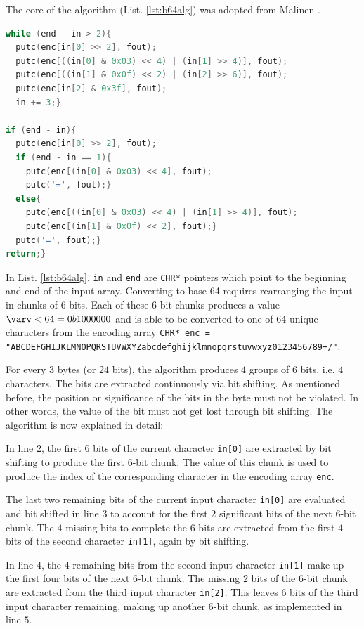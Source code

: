 \bigbreak
The core of the algorithm (List. \ref{lst:b64alg}) was adopted from Malinen \cite{Mal05}.

\begin{lstlisting}[language=C, caption=b64 algorithm, label=lst:b64alg]
while (end - in > 2){
  putc(enc[in[0] >> 2], fout);
  putc(enc[((in[0] & 0x03) << 4) | (in[1] >> 4)], fout);
  putc(enc[((in[1] & 0x0f) << 2) | (in[2] >> 6)], fout);
  putc(enc[in[2] & 0x3f], fout);
  in += 3;}
  
if (end - in){
  putc(enc[in[0] >> 2], fout);
  if (end - in == 1){
    putc(enc[(in[0] & 0x03) << 4], fout);
    putc('=', fout);}
  else{
    putc(enc[((in[0] & 0x03) << 4) | (in[1] >> 4)], fout);
    putc(enc[(in[1] & 0x0f) << 2], fout);}
  putc('=', fout);}
return;}
\end{lstlisting}

In List. \ref{lst:b64alg}, \lstinline{in} and \lstinline{end} are \lstinline{CHR*} pointers which point to the beginning and end of the input array. Converting to base 64 requires rearranging the input in chunks of 6 bits. Each of these 6-bit chunks produces a value $\varv < 64 = 0b1000000$ and is able to be converted to one of 64 unique characters from the encoding array \lstinline{CHR* enc = "ABCDEFGHIJKLMNOPQRSTUVWXYZabcdefghijklmnopqrstuvwxyz0123456789+/"}. 

\bigbreak
For every $3$ bytes (or $24$ bits), the algorithm produces $4$ groups of $6$ bits, i.e. $4$ characters. The bits are extracted continuously via bit shifting. As mentioned before, the position or significance of the bits in the byte must not be violated. In other words, the value of the bit must not get lost through bit shifting. The algorithm is now explained in detail: 

\bigbreak
In line $2$, the first $6$ bits of the current character \lstinline{in[0]} are extracted by bit shifting to produce the first $6$-bit chunk. The value of this chunk is used to produce the index of the corresponding character in the encoding array \lstinline{enc}. 

\bigbreak
The last two remaining bits of the current input character \lstinline{in[0]} are evaluated and bit shifted in line $3$ to account for the first $2$ significant bits of the next $6$-bit chunk. The $4$ missing bits to complete the $6$ bits are extracted from the first $4$ bits of the second character \lstinline{in[1]}, again by bit shifting.    

\bigbreak
In line $4$, the $4$ remaining bits from the second input character \lstinline{in[1]} make up the first four bits of the next $6$-bit chunk. The missing $2$ bits of the $6$-bit chunk are extracted from the third input character \lstinline{in[2]}. This leaves $6$ bits of the third input character remaining, making up another $6$-bit chunk, as implemented in line $5$.

